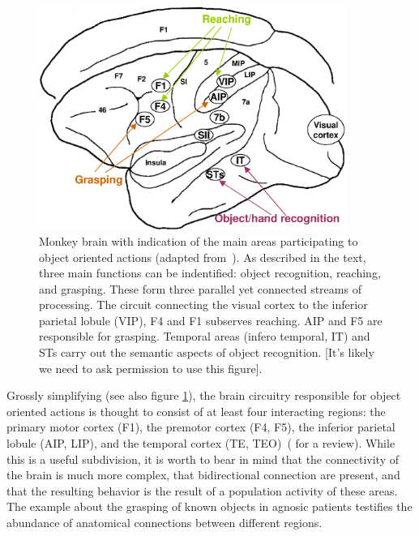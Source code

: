 %
%
\begin{figure}[tb]
\begin{center}
\includegraphics[width=10cm]{brain-schema.eps}
\caption{ 
\label{fig:brain-schema}
%
Monkey brain with indication of the main areas participating to object
oriented actions (adapted from~\cite{fagg-arbib-1998}). As described in the
text, three main functions can be indentified: object recognition, reaching,
and grasping. These form three parallel yet connected streams of 
processing. The circuit connecting the visual cortex to the inferior parietal 
lobule (VIP), F4 and F1 subserves reaching. AIP and F5 are responsible for
grasping. Temporal areas (infero temporal, IT) and STs carry out the
semantic aspects of object recognition.
[It's likely we need to ask permission to use this figure].
%
}
\end{center}
\end{figure}
%
%

Grossly simplifying (see also figure \ref{fig:brain-schema}), the brain circuitry responsible 
for object oriented actions is thought to consist of at least four 
interacting regions: the primary motor cortex (F1), the premotor cortex (F4, F5), the 
inferior parietal lobule (AIP, LIP), and the temporal cortex 
(TE, TEO)~(\cite{rizzolatti-fogassi-gallese-1997,fadiga00visuomotor,jeannerod97cognitive} 
for a review). 
While this is a useful subdivision, it is worth to bear in mind 
that the connectivity of the brain is much more complex, that bidirectional 
connection are present, and that the resulting behavior is the result of a 
population activity of these areas. The example about the grasping of known 
objects in agnosic patients testifies the abundance of anatomical connections 
between different regions.

